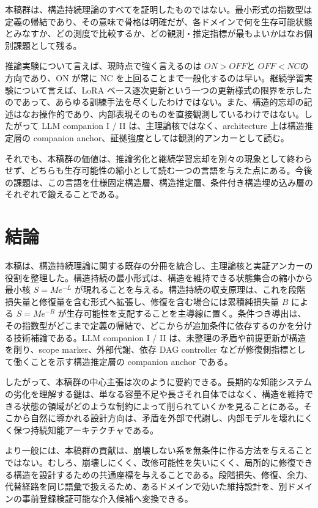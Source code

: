 \documentclass[12pt,a4paper]{article}
\begin{document}
本稿群は、構造持続理論のすべてを証明したものではない。最小形式の指数型は定義の帰結であり、その意味で骨格は明確だが、各ドメインで何を生存可能状態とみなすか、どの測度で比較するか、どの観測・推定指標が最もよいかはなお個別課題として残る。

推論実験について言えば、現時点で強く言えるのは \(ON > OFF\)と \(OFF < NC\)の方向であり、ON が常に NC を上回ることまで一般化するのは早い。継続学習実験について言えば、LoRA ベース逐次更新という一つの更新様式の限界を示したのであって、あらゆる訓練手法を尽くしたわけではない。また、構造的忘却の記述はなお操作的であり、内部表現そのものを直接観測しているわけではない。したがって LLM companion I / II は、主理論核ではなく、architecture 上は構造推定層の companion anchor、証拠強度としては観測的アンカーとして読む。

それでも、本稿群の価値は、推論劣化と継続学習忘却を別々の現象として終わらせず、どちらも生存可能性の縮小として読む一つの言語を与えた点にある。今後の課題は、この言語を仕様固定構造層、構造推定層、条件付き構造埋め込み層のそれぞれで鍛えることである。

\section{結論}\label{ux7d50ux8ad6}

本稿は、構造持続理論に関する既存の分冊を統合し、主理論核と実証アンカーの役割を整理した。構造持続の最小形式は、構造を維持できる状態集合の縮小から最小核 \(S=Me^{-L}\) が現れることを与える。構造持続の収支原理は、これを段階損失量と修復量を含む形式へ拡張し、修復を含む場合には累積純損失量 \(B\) による \(S=Me^{-B}\) が生存可能性を支配することを主導線に置く。条件つき導出は、その指数型がどこまで定義の帰結で、どこからが追加条件に依存するのかを分ける技術補論である。LLM companion I / II は、未整理の矛盾や前提更新が構造を削り、scope marker、外部代謝、依存 DAG controller などが修復側指標として働くことを示す構造推定層の companion anchor である。

したがって、本稿群の中心主張は次のように要約できる。長期的な知能システムの劣化を理解する鍵は、単なる容量不足や長さそれ自体ではなく、構造を維持できる状態の領域がどのような制約によって削られていくかを見ることにある。そこから自然に導かれる設計方向は、矛盾を外部で代謝し、内部モデルを壊れにくく保つ持続知能アーキテクチャである。

より一般には、本稿群の貢献は、崩壊しない系を無条件に作る方法を与えることではない。むしろ、崩壊しにくく、改修可能性を失いにくく、局所的に修復できる構造を設計するための共通座標を与えることである。段階損失、修復、余力、代替経路を同じ語彙で扱えるため、あるドメインで効いた維持設計を、別ドメインの事前登録検証可能な介入候補へ変換できる。
\end{document}

